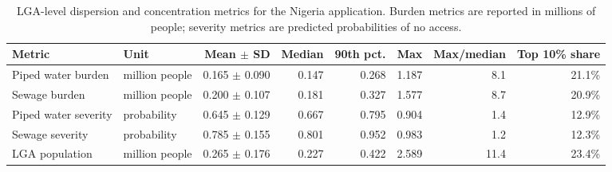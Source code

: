 \begin{table}
\caption{LGA-level dispersion and concentration metrics for the Nigeria application. Burden metrics are reported in millions of people; severity metrics are predicted probabilities of no access.}
\label{tab:nigeria_lga_metric_summary}
\begin{tabular}{llrrrrrr}
\toprule
Metric & Unit & Mean $\pm$ SD & Median & 90th pct. & Max & Max/median & Top 10\% share \\
\midrule
Piped water burden & million people & 0.165 $\pm$ 0.090 & 0.147 & 0.268 & 1.187 & 8.1 & 21.1\% \\
Sewage burden & million people & 0.200 $\pm$ 0.107 & 0.181 & 0.327 & 1.577 & 8.7 & 20.9\% \\
Piped water severity & probability & 0.645 $\pm$ 0.129 & 0.667 & 0.795 & 0.904 & 1.4 & 12.9\% \\
Sewage severity & probability & 0.785 $\pm$ 0.155 & 0.801 & 0.952 & 0.983 & 1.2 & 12.3\% \\
LGA population & million people & 0.265 $\pm$ 0.176 & 0.227 & 0.422 & 2.589 & 11.4 & 23.4\% \\
\bottomrule
\end{tabular}
\end{table}
